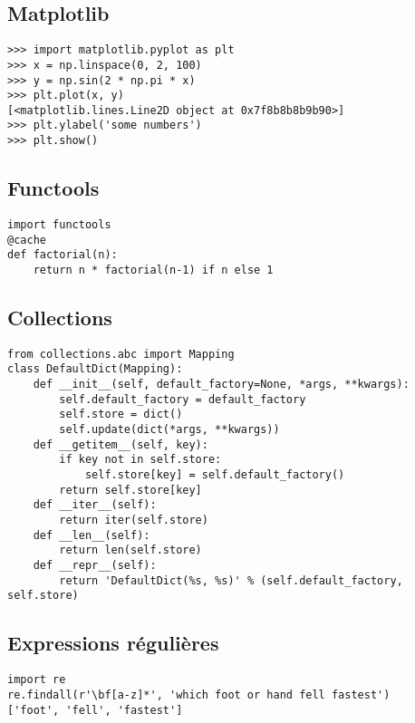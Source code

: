\documentclass{article}
\begin{document}
\begin{multicols*}{4}
\subsection*{Matplotlib}
\begin{lstlisting}
>>> import matplotlib.pyplot as plt
>>> x = np.linspace(0, 2, 100)
>>> y = np.sin(2 * np.pi * x)
>>> plt.plot(x, y)
[<matplotlib.lines.Line2D object at 0x7f8b8b8b9b90>]
>>> plt.ylabel('some numbers')
>>> plt.show()
\end{lstlisting}

\subsection*{Functools}
\begin{lstlisting}
import functools 
@cache
def factorial(n):
    return n * factorial(n-1) if n else 1
\end{lstlisting}

\subsection*{Collections}
\begin{lstlisting}
from collections.abc import Mapping
class DefaultDict(Mapping):
    def __init__(self, default_factory=None, *args, **kwargs):
        self.default_factory = default_factory
        self.store = dict()
        self.update(dict(*args, **kwargs))
    def __getitem__(self, key):
        if key not in self.store:
            self.store[key] = self.default_factory()
        return self.store[key]
    def __iter__(self):
        return iter(self.store)
    def __len__(self):
        return len(self.store)
    def __repr__(self):
        return 'DefaultDict(%s, %s)' % (self.default_factory, self.store)
\end{lstlisting}

\subsection*{Expressions régulières}
\begin{lstlisting}
import re 
re.findall(r'\bf[a-z]*', 'which foot or hand fell fastest')
['foot', 'fell', 'fastest']

\end{lstlisting}


\end{multicols*}
\end{document}
